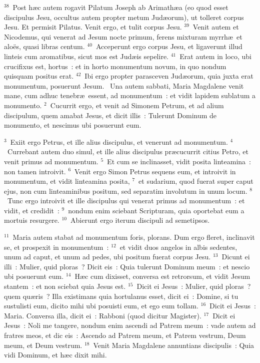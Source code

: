 ${}^{38}$~Post h\ae c autem rogavit Pilatum Joseph ab Arimath\ae a (eo quod esset discipulus Jesu, occultus autem propter metum Jud\ae orum), ut tolleret corpus Jesu. Et permisit Pilatus. Venit ergo, et tulit corpus Jesu.
${}^{39}$~Venit autem et Nicodemus, qui venerat ad Jesum nocte primum, ferens mixturam myrrh\ae\ et alo\"es, quasi libras centum.
${}^{40}$~Acceperunt ergo corpus Jesu, et ligaverunt illud linteis cum aromatibus, sicut mos est Jud\ae is sepelire.
${}^{41}$~Erat autem in loco, ubi crucifixus est, hortus~: et in horto monumentum novum, in quo nondum quisquam positus erat.
${}^{42}$~Ibi ergo propter parasceven Jud\ae orum, quia juxta erat monumentum, posuerunt Jesum.
~Una autem sabbati, Maria Magdalene venit mane, cum adhuc tenebr\ae\ essent, ad monumentum~: et vidit lapidem sublatum a monumento.
${}^{2}$~Cucurrit ergo, et venit ad Simonem Petrum, et ad alium discipulum, quem amabat Jesus, et dicit illis~: Tulerunt Dominum de monumento, et nescimus ubi posuerunt eum.


${}^{3}$~Exiit ergo Petrus, et ille alius discipulus, et venerunt ad monumentum.
${}^{4}$~Currebant autem duo simul, et ille alius discipulus pr\ae cucurrit citius Petro, et venit primus ad monumentum.
${}^{5}$~Et cum se inclinasset, vidit posita linteamina~: non tamen introivit.
${}^{6}$~Venit ergo Simon Petrus sequens eum, et introivit in monumentum, et vidit linteamina posita,
${}^{7}$~et sudarium, quod fuerat super caput ejus, non cum linteaminibus positum, sed separatim involutum in unum locum.
${}^{8}$~Tunc ergo introivit et ille discipulus qui venerat primus ad monumentum~: et vidit, et credidit~:
${}^{9}$~nondum enim sciebant Scripturam, quia oportebat eum a mortuis resurgere.
${}^{10}$~Abierunt ergo iterum discipuli ad semetipsos.


${}^{11}$~Maria autem stabat ad monumentum foris, plorans. Dum ergo fleret, inclinavit se, et prospexit in monumentum~:
${}^{12}$~et vidit duos angelos in albis sedentes, unum ad caput, et unum ad pedes, ubi positum fuerat corpus Jesu.
${}^{13}$~Dicunt ei illi~: Mulier, quid ploras~? Dicit eis~: Quia tulerunt Dominum meum~: et nescio ubi posuerunt eum.
${}^{14}$~H\ae c cum dixisset, conversa est retrorsum, et vidit Jesum stantem~: et non sciebat quia Jesus est.
${}^{15}$~Dicit ei Jesus~: Mulier, quid ploras~? quem qu\ae ris~? Illa existimans quia hortulanus esset, dicit ei~: Domine, si tu sustulisti eum, dicito mihi ubi posuisti eum, et ego eum tollam.
${}^{16}$~Dicit ei Jesus~: Maria. Conversa illa, dicit ei~: Rabboni (quod dicitur Magister).
${}^{17}$~Dicit ei Jesus~: Noli me tangere, nondum enim ascendi ad Patrem meum~: vade autem ad fratres meos, et dic eis~: Ascendo ad Patrem meum, et Patrem vestrum, Deum meum, et Deum vestrum.
${}^{18}$~Venit Maria Magdalene annuntians discipulis~: Quia vidi Dominum, et h\ae c dixit mihi.


